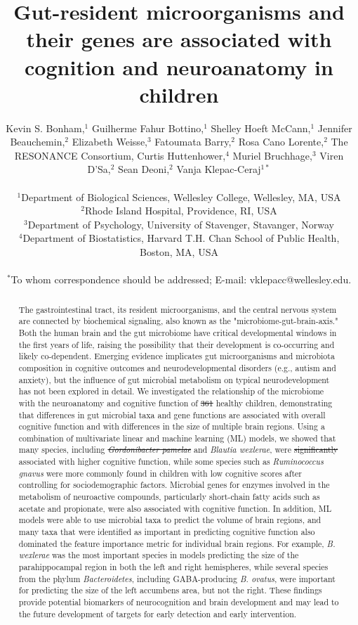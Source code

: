 \documentclass{article}
\title{Gut-resident microorganisms and their genes are associated with cognition and neuroanatomy in children}
\author{%
    \parbox{\linewidth}{\centering
        Kevin S. Bonham,$^{1}$
        Guilherme Fahur Bottino,$^{1}$
        Shelley Hoeft McCann,$^{1}$
        Jennifer Beauchemin,$^{2}$
        Elizabeth Weisse,$^{3}$
        Fatoumata Barry,$^{2}$
        Rosa Cano Lorente,$^{2}$
        The RESONANCE Consortium,
        Curtis Huttenhower,$^{4}$
        Muriel Bruchhage,$^{3}$
        Viren D'Sa,$^{2}$
        Sean Deoni,$^{2}$
        Vanja Klepac-Ceraj$^{1\ast}$
    }
\\
\normalsize{$^{1}$Department of Biological Sciences, Wellesley College, Wellesley, MA, USA}\\
\normalsize{$^{2}$Rhode Island Hospital, Providence, RI, USA}\\
\normalsize{$^{3}$Department of Psychology, University of Stavenger, Stavanger, Norway}\\
\normalsize{$^{4}$Department of Biostatistics, Harvard T.H. Chan School of Public Health, Boston, MA, USA}\\
\\
\normalsize{$^\ast$To whom correspondence should be addressed; E-mail:  vklepacc@wellesley.edu.}
}
\date{}
\providecommand{\DIFadd}[1]{{\protect\color{blue}\uwave{#1}}} %
\providecommand{\DIFdel}[1]{{\protect\color{red}\sout{#1}}}                      %
\providecommand{\DIFaddbegin}{} %
\providecommand{\DIFaddend}{} %
\providecommand{\DIFdelbegin}{} %
\providecommand{\DIFdelend}{} %
\newcommand{\DIFscaledelfig}{0.5}
\newlength{\DIFdelgraphicswidth} %
\newlength{\DIFdelgraphicsheight} %
\newcommand{\DIFaddincludegraphics}[2][]{{\color{blue}\fbox{\DIFOincludegraphics[#1]{#2}}}} %
\newcommand{\DIFdelincludegraphics}[2][]{%
\sbox{\DIFdelgraphicsbox}{\DIFOincludegraphics[#1]{#2}}%
\settoboxwidth{\DIFdelgraphicswidth}{\DIFdelgraphicsbox} %
\settoboxtotalheight{\DIFdelgraphicsheight}{\DIFdelgraphicsbox} %
\scalebox{\DIFscaledelfig}{%
\parbox[b]{\DIFdelgraphicswidth}{\usebox{\DIFdelgraphicsbox}\\[-\baselineskip] \rule{\DIFdelgraphicswidth}{0em}}\llap{\resizebox{\DIFdelgraphicswidth}{\DIFdelgraphicsheight}{%
\setlength{\unitlength}{\DIFdelgraphicswidth}%
\begin{picture}(1,1)%
\thicklines\linethickness{2pt} %
{\color[rgb]{1,0,0}\put(0,0){\framebox(1,1){}}}%
{\color[rgb]{1,0,0}\put(0,0){\line( 1,1){1}}}%
{\color[rgb]{1,0,0}\put(0,1){\line(1,-1){1}}}%
\end{picture}%
}\hspace*{3pt}}} %
} %
\DeclareRobustCommand{\DIFaddbegin}{\DIFOaddbegin \let\includegraphics\DIFaddincludegraphics} %
\DeclareRobustCommand{\DIFaddend}{\DIFOaddend \let\includegraphics\DIFOincludegraphics} %
\DeclareRobustCommand{\DIFdelbegin}{\DIFOdelbegin \let\includegraphics\DIFdelincludegraphics} %
\DeclareRobustCommand{\DIFdelend}{\DIFOaddend \let\includegraphics\DIFOincludegraphics} %
\begin{document}
\baselineskip24pt

\maketitle 

\begin{abstract}
The gastrointestinal tract, its resident microorganisms, and the central
nervous system are connected by biochemical signaling, also known as the
"microbiome-gut-brain-axis." Both the human brain and the gut microbiome
have critical developmental windows in the first years of life,
raising the possibility that their development is co-occurring and
likely co-dependent. Emerging evidence implicates gut microorganisms and
microbiota composition in cognitive outcomes and neurodevelopmental
disorders (e.g., autism and anxiety), but the influence of gut microbial
metabolism on typical neurodevelopment has not been explored in detail.
We investigated the relationship of the microbiome with the neuroanatomy
and cognitive function of \DIFdelbegin \DIFdel{361 }\DIFdelend \DIFaddbegin \DIFadd{381 }\DIFaddend healthy children, demonstrating that
differences in gut microbial taxa and gene functions are associated with
overall cognitive function and with differences in the size of
multiple brain regions.
Using a combination of multivariate linear and machine learning (ML) models,
we showed that many species,
including \emph{\DIFdelbegin \DIFdel{Gordonibacter pamelae}\DIFdelend \DIFaddbegin \DIFadd{Alistipes obesi}\DIFaddend } and \emph{Blautia wexlerae}, were \DIFdelbegin \DIFdel{significantly }\DIFdelend %
associated with higher cognitive function, while some
species such as \emph{Ruminococcus gnavus} were more commonly found in %
children with low cognitive scores after controlling for sociodemographic factors.
Microbial genes for enzymes involved in the metabolism of
neuroactive compounds, particularly short-chain fatty acids such as
acetate and propionate, were also associated with cognitive function.
In addition, ML models were able to use microbial taxa to predict the
volume of brain regions, and many taxa that were identified
as important in predicting cognitive function also dominated the
feature importance metric for individual brain regions.
For example, \emph{B. wexlerae} %
was the most important species in models predicting the size of the parahippocampal region
in both the left and right hemispheres, while several species from
the phylum \textit{Bacteroidetes}, including GABA-producing %
\emph{B. ovatus}, were important for predicting
the size of the left accumbens area, but not the right. These
findings provide potential biomarkers of neurocognition and brain development
and may lead to the future development of targets for early detection and early
intervention.
\end{abstract}
\end{document}
